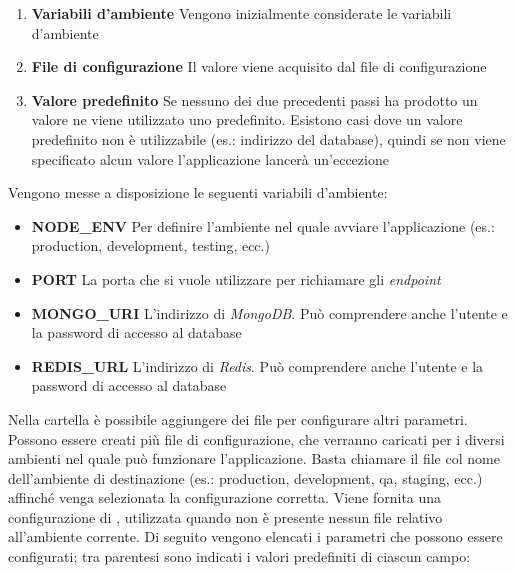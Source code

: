 \begin{enumerate}
	\item \textbf{Variabili d'ambiente}
	Vengono inizialmente considerate le variabili d'am\-bien\-te
	\item \textbf{File di configurazione}
	Il valore viene acquisito dal file di configurazione
	\item \textbf{Valore predefinito}
	Se nessuno dei due precedenti passi ha prodotto un valore ne viene utilizzato uno predefinito. Esistono casi dove un valore predefinito non è utilizzabile (es.: indirizzo del database), quindi se non viene specificato alcun valore l'applicazione lancerà un'eccezione
\end{enumerate}

Vengono messe a disposizione le seguenti variabili d'ambiente:

\begin{itemize}
	\item \textbf{NODE\_ENV}
	Per definire l'ambiente nel quale avviare l'applicazione (es.: production, development, testing, ecc.)
	\item \textbf{PORT}
	La porta che si vuole utilizzare per richiamare gli \emph{endpoint}
	\item \textbf{MONGO\_URI}
	L'indirizzo di \emph{MongoDB}. Può comprendere anche l'utente e la password di accesso al database
	\item \textbf{REDIS\_URL}
	L'indirizzo di \emph{Redis}. Può comprendere anche l'utente e la password di accesso al database
\end{itemize}

Nella cartella  è possibile aggiungere dei file per configurare altri parametri. Possono essere creati più file di configurazione, che verranno caricati per i diversi ambienti nel quale può funzionare l'applicazione. Basta chiamare il file col nome dell'ambiente di destinazione (es.: production, development, qa, staging, ecc.) affinché venga selezionata la configurazione corretta. Viene fornita una configurazione di , utilizzata quando non è presente nessun file relativo all'ambiente corrente. Di seguito vengono elencati i parametri che possono essere configurati; tra parentesi sono indicati i valori predefiniti di ciascun campo:

